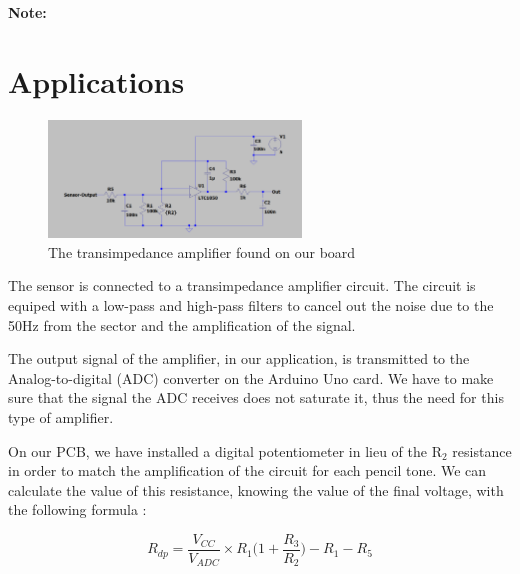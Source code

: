 \documentclass[10pt]{datasheet}
\begin{document}
\textbf{Note:}

\newpage

\section{Applications}

\begin{figure}[h!]
	\centering
	\includegraphics[width=0.6\textwidth]{Cover/TransimpedanceAmp.png}
    \captionsetup{justification=centering}
	\caption{\small{The transimpedance amplifier found on our board}}
\end{figure}

The sensor is connected to a transimpedance amplifier circuit. The circuit is equiped with a 
low-pass and high-pass filters to cancel out the noise due to the 50Hz from the sector and the amplification 
of the signal. 

The output signal of the amplifier, in our application, is transmitted to the Analog-to-digital (ADC) converter on the Arduino Uno
card. We have to make sure that the signal the ADC receives does not saturate it, thus the need for this type of amplifier. 

On our PCB, we have installed a digital potentiometer in lieu of the $\text{R}_2$ resistance in order to match the amplification of the circuit
for each pencil tone. We can calculate the value of this resistance, knowing the value of the final voltage, with the following formula :

\begin{equation*}
    R_{dp} = \frac{V_{CC}}{V_{ADC}}\times R_1\Big(1 + \frac{R_3}{R_2}\Big) - R_1 - R_5
\end{equation*}
\end{document}
